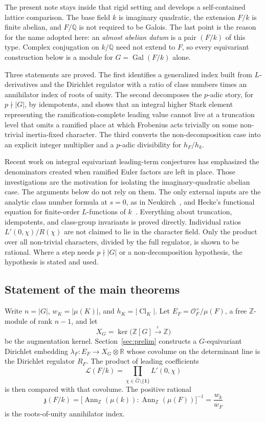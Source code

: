\documentclass[11pt]{article}
\theoremstyle{plain}
\theoremstyle{definition}
\theoremstyle{remark}
\newcommand{\Z}{\mathbb{Z}}
\newcommand{\Q}{\mathbb{Q}}
\newcommand{\R}{\mathbb{R}}
\newcommand{\OK}{\mathcal{O}}
\newcommand{\Cl}{\operatorname{Cl}}
\newcommand{\Gal}{\operatorname{Gal}}
\newcommand{\Ann}{\operatorname{Ann}}
\newcommand{\triv}{\mathbf{1}}
\begin{document}
The present note stays inside that rigid setting and develops a self-contained lattice comparison.
The base field $k$ is imaginary quadratic, the extension $F/k$ is finite abelian, and $F/\Q$ is not required to be Galois.
The last point is the reason for the name adopted here: an \emph{almost abelian datum} is a pair $(F/k)$ of this type.
Complex conjugation on $k/\Q$ need not extend to $F$, so every equivariant construction below is a module for $G=\Gal(F/k)$ alone.

Three statements are proved.
The first identifies a generalized index built from $L$-derivatives and the Dirichlet regulator with a ratio of class numbers times an annihilator index of roots of unity.
The second decomposes the $p$-adic story, for $p\nmid|G|$, by idempotents, and shows that an integral higher Stark element representing the ramification-complete leading value cannot live at a truncation level that omits a ramified place at which Frobenius acts trivially on some non-trivial inertia-fixed character.
The third converts the non-decomposition case into an explicit integer multiplier and a $p$-adic divisibility for $h_F/h_k$.

Recent work on integral equivariant leading-term conjectures has emphasized the denominators created when ramified Euler factors are left in place.
Those investigations are the motivation for isolating the imaginary-quadratic abelian case.
The arguments below do not rely on them.
The only external inputs are the analytic class number formula at $s=0$, as in Neukirch~\cite[Chapter~VII]{Neukirch}, and Hecke's functional equation for finite-order $L$-functions of $k$~\cite{Hecke1918,Neukirch}.
Everything about truncation, idempotents, and class-group invariants is proved directly.
Individual ratios $L'(0,\chi)/R(\chi)$ are not claimed to lie in the character field.
Only the product over all non-trivial characters, divided by the full regulator, is shown to be rational.
Where a step needs $p\nmid|G|$ or a non-decomposition hypothesis, the hypothesis is stated and used.

\subsection{Statement of the main theorems}
\label{subsec:statements}

Write $n=|G|$, $w_K=|\mu(K)|$, and $h_K=|\Cl_K|$.
Let $E_F=\OK_F^\times/\mu(F)$, a free $\Z$-module of rank $n-1$, and let
\[
  X_G=\ker\bigl(\Z[G]\xrightarrow{\varepsilon}\Z\bigr)
\]
be the augmentation kernel.
Section~\ref{sec:prelim} constructs a $G$-equivariant Dirichlet embedding $\lambda_F:E_F\to X_G\otimes\R$ whose covolume on the determinant line is the Dirichlet regulator $R_F$.
The product of leading coefficients
\[
  \mathcal{L}(F/k)=\prod_{\chi\in\widehat G\setminus\{\triv\}}L'(0,\chi)
\]
is then compared with that covolume.
The positive rational
\[
  \mathfrak{z}(F/k)
  =\bigl[\Ann_{\Z}(\mu(k)):\Ann_{\Z}(\mu(F))\bigr]^{-1}
  =\frac{w_k}{w_F}
\]
is the roots-of-unity annihilator index.
\end{document}
